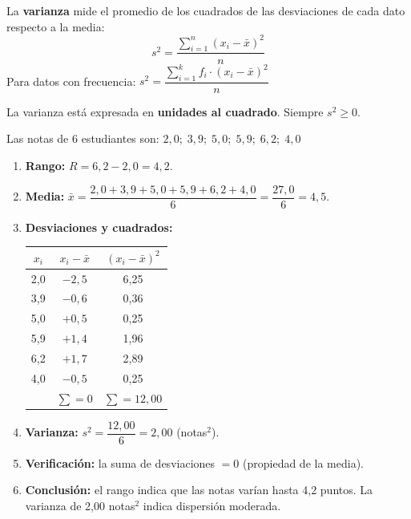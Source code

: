 \documentclass[11pt, letterpaper]{article}
\begin{document}
\begin{tcolorbox}[importantbox, title={Varianza $s^2$}]
La \textbf{varianza} mide el promedio de los cuadrados de las desviaciones de cada dato respecto a la media:
\[
s^2 = \frac{\displaystyle\sum_{i=1}^{n}(x_i - \bar{x})^2}{n}
\]
Para datos con frecuencia: $s^2 = \dfrac{\displaystyle\sum_{i=1}^{k} f_i \cdot (x_i - \bar{x})^2}{n}$

La varianza est\'a expresada en \textbf{unidades al cuadrado}. Siempre $s^2 \geq 0$.
\end{tcolorbox}

\begin{tcolorbox}[examplebox, title={Ej. 11. C\'alculo de rango y varianza}]
Las notas de 6 estudiantes son: $2{,}0;\; 3{,}9;\; 5{,}0;\; 5{,}9;\; 6{,}2;\; 4{,}0$

\begin{enumerate}[label=\textbf{Paso \arabic*.}]
  \item \textbf{Rango:} $R = 6{,}2 - 2{,}0 = 4{,}2$.
  \medskip
  \item \textbf{Media:} $\bar{x} = \dfrac{2{,}0 + 3{,}9 + 5{,}0 + 5{,}9 + 6{,}2 + 4{,}0}{6} = \dfrac{27{,}0}{6} = 4{,}5$.
  \medskip
  \item \textbf{Desviaciones y cuadrados:}
  \begin{center}
  \renewcommand{\arraystretch}{1.2}
  \begin{tabular}{c c c}
  \toprule
  $x_i$ & $x_i - \bar{x}$ & $(x_i - \bar{x})^2$\\
  \midrule
  2{,}0 & $-2{,}5$ & 6{,}25\\
  3{,}9 & $-0{,}6$ & 0{,}36\\
  5{,}0 & $+0{,}5$ & 0{,}25\\
  5{,}9 & $+1{,}4$ & 1{,}96\\
  6{,}2 & $+1{,}7$ & 2{,}89\\
  4{,}0 & $-0{,}5$ & 0{,}25\\
  \midrule
  & $\sum = 0$ & $\sum = 12{,}00$\\
  \bottomrule
  \end{tabular}
  \end{center}
  \medskip
  \item \textbf{Varianza:} $s^2 = \dfrac{12{,}00}{6} = 2{,}00$ (notas$^2$).
  \medskip
  \item \textbf{Verificaci\'on:} la suma de desviaciones $= 0$ \checkmark (propiedad de la media).
  \medskip
  \item \textbf{Conclusi\'on:} el rango indica que las notas var\'ian hasta 4{,}2 puntos. La varianza de 2{,}00 notas$^2$ indica dispersi\'on moderada.
\end{enumerate}
\end{tcolorbox}
\end{document}
